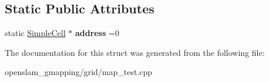 \subsection*{Static Public Attributes}
\begin{DoxyCompactItemize}
\item 
\mbox{\label{structSimpleCell_a0ee63dba117ffe2c51e7f75e020ad931}} 
static \hyperlink{structSimpleCell}{Simple\+Cell} $\ast$ {\bfseries address} =0
\end{DoxyCompactItemize}


The documentation for this struct was generated from the following file\+:\begin{DoxyCompactItemize}
\item 
openslam\+\_\+gmapping/grid/map\+\_\+test.\+cpp\end{DoxyCompactItemize}
